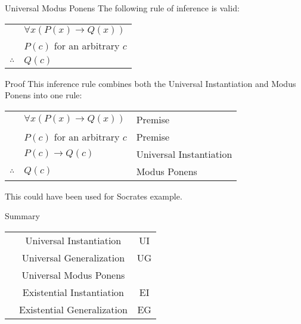 \documentclass{article}
\begin{document}
\begin{parag}{Universal Modus Ponens}
    The following rule of inference is valid:
    \begin{center}
    \begin{tabular}{rl}
        & $\forall x \left(P\left(x\right) \to Q\left(x\right)\right)$ \\
        & $P\left(c\right)$ for an arbitrary $c$  \\
        \hline
        $\therefore$ & $Q\left(c\right)$
    \end{tabular}
    \end{center}

    \begin{subparag}{Proof}
        This inference rule combines both the Universal Instantiation and Modus Ponens into one rule:
        \begin{center}
        \begin{tabular}{rll}
            & $\forall x \left(P\left(x\right) \to Q\left(x\right)\right)$ & Premise  \\
            & $P\left(c\right)$ for an arbitrary $c$ & Premise  \\
            & $P\left(c\right) \to Q\left(c\right)$ & Universal Instantiation  \\
            \hline
            $\therefore$ & $Q\left(c\right)$ & Modus Ponens
        \end{tabular}
        \end{center}

        This could have been used for Socrates example.
    \end{subparag}
\end{parag}

\begin{parag}{Summary}
    \begin{center}
        \begin{tabularx}{\linewidth}{|>{\hsize}C|>{\hsize}C|>{\hsize}C|}
        \hline
         &  &  \\
        \hline
         & Universal Instantiation & UI  \\
        \hline
         & Universal Generalization & UG  \\
        \hline
         & Universal Modus Ponens &  \\
        \hline
         & Existential Instantiation & EI  \\
        \hline
         & Existential Generalization & EG  \\
        \hline
    \end{tabularx}
    \end{center}
\end{parag}
\end{document}
